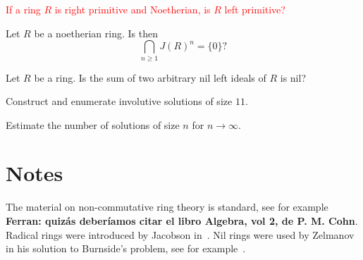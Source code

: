 


\begin{problem}[Kaplansky]
\label{prob:Kaplansky}
\textcolor{red}{If a ring $R$ is right primitive and Noetherian, is $R$ left primitive?}
\end{problem}

\begin{problem}[Jacobson]
\label{prob:Jacobson}
Let $R$ be a noetherian ring. Is then 
\[
\bigcap_{n\geq1}J(R)^n=\{0\}?
\]
\end{problem}

\begin{problem}[K\"othe]
	\label{prob:Koethe}
	Let $R$ be a ring. Is the sum 
	of two arbitrary nil left ideals of $R$ is nil?
\end{problem}

\begin{problem}
	Construct and enumerate involutive solutions of size $11$. 
\end{problem}

\begin{problem}
	Estimate the number of solutions of size $n$ for $n\to\infty$. 
\end{problem}

\section*{Notes}

The material on non-commutative ring theory is standard, see for example~\cite{MR3308118} {\bf Ferran: quiz\'as deber\'{i}amos citar el libro Algebra, vol 2, de P. M. Cohn}.
Radical rings were introduced by Jacobson in~\cite{MR12271}. Nil rings were
used by Zelmanov in his solution to Burnside's problem, see for example~\cite{MR1199575}.

